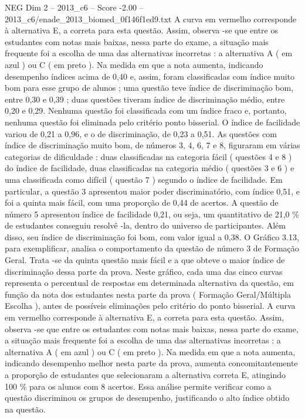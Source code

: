 \begin{textsample}{NEG Dim 2 – 2013\_c6 – Score -2.00 – 2013\_c6/enade\_2013\_biomed\_0f146f1ed9.txt}
A curva em vermelho corresponde à alternativa E, a correta para esta questão.
Assim, observa -se que entre os estudantes com notas mais baixas, nessa parte do exame, a situação mais frequente foi a escolha de uma das alternativas incorretas : a alternativa A ( em azul ) ou C ( em preto ).
Na medida em que a nota aumenta, indicando desempenho índices acima de 0,40 e, assim, foram classificadas com índice muito bom para esse grupo de alunos ; uma questão teve índice de discriminação bom, entre 0,30 e 0,39 ; duas questões tiveram índice de discriminação médio, entre 0,20 e 0,29.
Nenhuma questão foi classificada com um índice fraco e, portanto, nenhuma questão foi eliminada pelo critério ponto bisserial.
O índice de facilidade variou de 0,21 a 0,96, e o de discriminação, de 0,23 a 0,51.
As questões com índice de discriminação muito bom, de números 3, 4, 6, 7 e 8, figuraram em várias categorias de dificuldade : duas classificadas na categoria fácil ( questões 4 e 8 ) do índice de facilidade, duas classificadas na categoria médio ( questões 3 e 6 ) e uma classificada como difícil ( questão 7 ) segundo o índice de facilidade.
Em particular, a questão 3 apresentou maior poder discriminatório, com índice 0,51, e foi a quinta mais fácil, com uma proporção de 0,44 de acertos.
A questão de número 5 apresentou índice de facilidade 0,21, ou seja, um quantitativo de 21,0 \% de estudantes conseguiu resolvê -la, dentro do universo de participantes.
Além disso, seu índice de discriminação foi bom, com valor igual a 0,38.
O Gráfico 3.13, para exemplificar, analisa o comportamento da questão de número 3 de Formação Geral.
Trata -se da quinta questão mais fácil e a que obteve o maior índice de discriminação dessa parte da prova.
Neste gráfico, cada uma das cinco curvas representa o percentual de respostas em determinada alternativa da questão, em função da nota dos estudantes nesta parte da prova ( Formação Geral/Múltipla Escolha ), antes de possíveis eliminações pelo critério do ponto bisserial.
A curva em vermelho corresponde à alternativa E, a correta para esta questão.
Assim, observa -se que entre os estudantes com notas mais baixas, nessa parte do exame, a situação mais frequente foi a escolha de uma das alternativas incorretas : a alternativa A ( em azul ) ou C ( em preto ).
Na medida em que a nota aumenta, indicando desempenho melhor nesta parte da prova, aumenta concomitantemente a proporção de estudantes que selecionaram a alternativa correta E, atingindo 100 \% para os alunos com 8 acertos.
Essa análise permite verificar como a questão discriminou os grupos de desempenho, justificando o alto índice obtido na questão.

\end{textsample}
